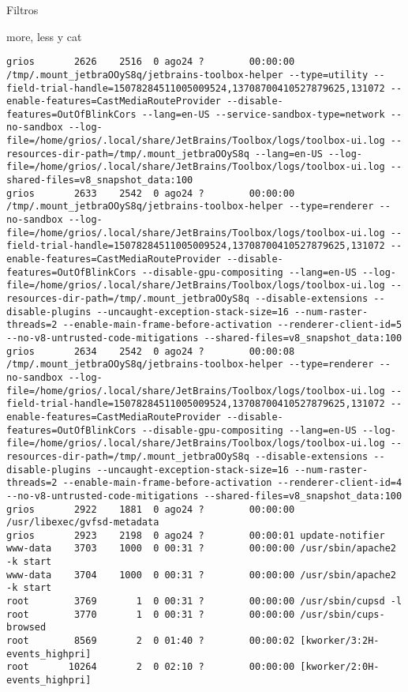 \begin{section}{Filtros}
\begin{subsection}{more, less y cat}
\begin{lstlisting}[style=Ubuntu]
grios       2626    2516  0 ago24 ?        00:00:00 /tmp/.mount_jetbraOOyS8q/jetbrains-toolbox-helper --type=utility --field-trial-handle=15078284511005009524,13708700410527879625,131072 --enable-features=CastMediaRouteProvider --disable-features=OutOfBlinkCors --lang=en-US --service-sandbox-type=network --no-sandbox --log-file=/home/grios/.local/share/JetBrains/Toolbox/logs/toolbox-ui.log --resources-dir-path=/tmp/.mount_jetbraOOyS8q --lang=en-US --log-file=/home/grios/.local/share/JetBrains/Toolbox/logs/toolbox-ui.log --shared-files=v8_snapshot_data:100
grios       2633    2542  0 ago24 ?        00:00:00 /tmp/.mount_jetbraOOyS8q/jetbrains-toolbox-helper --type=renderer --no-sandbox --log-file=/home/grios/.local/share/JetBrains/Toolbox/logs/toolbox-ui.log --field-trial-handle=15078284511005009524,13708700410527879625,131072 --enable-features=CastMediaRouteProvider --disable-features=OutOfBlinkCors --disable-gpu-compositing --lang=en-US --log-file=/home/grios/.local/share/JetBrains/Toolbox/logs/toolbox-ui.log --resources-dir-path=/tmp/.mount_jetbraOOyS8q --disable-extensions --disable-plugins --uncaught-exception-stack-size=16 --num-raster-threads=2 --enable-main-frame-before-activation --renderer-client-id=5 --no-v8-untrusted-code-mitigations --shared-files=v8_snapshot_data:100
grios       2634    2542  0 ago24 ?        00:00:08 /tmp/.mount_jetbraOOyS8q/jetbrains-toolbox-helper --type=renderer --no-sandbox --log-file=/home/grios/.local/share/JetBrains/Toolbox/logs/toolbox-ui.log --field-trial-handle=15078284511005009524,13708700410527879625,131072 --enable-features=CastMediaRouteProvider --disable-features=OutOfBlinkCors --disable-gpu-compositing --lang=en-US --log-file=/home/grios/.local/share/JetBrains/Toolbox/logs/toolbox-ui.log --resources-dir-path=/tmp/.mount_jetbraOOyS8q --disable-extensions --disable-plugins --uncaught-exception-stack-size=16 --num-raster-threads=2 --enable-main-frame-before-activation --renderer-client-id=4 --no-v8-untrusted-code-mitigations --shared-files=v8_snapshot_data:100
grios       2922    1881  0 ago24 ?        00:00:00 /usr/libexec/gvfsd-metadata
grios       2923    2198  0 ago24 ?        00:00:01 update-notifier
www-data    3703    1000  0 00:31 ?        00:00:00 /usr/sbin/apache2 -k start
www-data    3704    1000  0 00:31 ?        00:00:00 /usr/sbin/apache2 -k start
root        3769       1  0 00:31 ?        00:00:00 /usr/sbin/cupsd -l
root        3770       1  0 00:31 ?        00:00:00 /usr/sbin/cups-browsed
root        8569       2  0 01:40 ?        00:00:02 [kworker/3:2H-events_highpri]
root       10264       2  0 02:10 ?        00:00:00 [kworker/2:0H-events_highpri]

\end{lstlisting}
\end{subsection}
\end{section}
